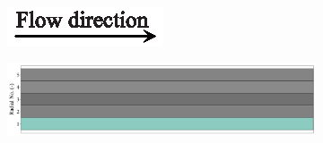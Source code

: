 \documentclass[preprint,12pt]{elsarticle}
\begin{document}
\begin{figure}[h!]
     \centering
     \begin{subfigure}[b]{\textwidth}
     	\includegraphics[width=\textwidth]{flow_dir.eps}
     \end{subfigure}
     \begin{subfigure}[b]{0.85\textwidth}
	\includegraphics[width=\textwidth]{results/segments/5seg/20C80T/seg.png}	
     \end{subfigure}
     \hfill
     \begin{subfigure}[b]{0.1\textwidth}

\end{subfigure}
\end{figure}
\end{document}
